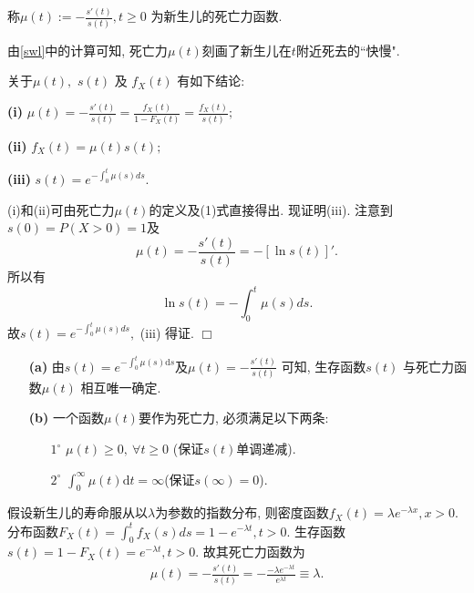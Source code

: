 \documentclass[a4paper,10pt]{ctexbook}
\def\qed{\hfill$\Box$\medskip}
\begin{document}
\begin{definition}
    称$\mu(t):=-\frac{s'(t)}{s(t)},t\ge 0$ 为新生儿的死亡力函数.
\end{definition}
由\eqref{swl}中的计算可知, 死亡力$\mu(t)$刻画了新生儿在$t$附近死去的``快慢".

\begin{proposition} 关于$\mu(t),$ $s(t)$ 及 $f_X(t)$ 有如下结论:

    {\rm\bf(i)} $\mu(t)=-\frac{s'(t)}{s(t)}=\frac{f_X(t)}{1-F_X(t)}=\frac{f_X(t)}{s(t)};$

    {\rm\bf(ii)} $f_X(t)=\mu(t)s(t);$

    {\rm\bf(iii)} $s(t)=e^{-\int_0^t\mu(s)ds}.$

\end{proposition}
\proof (i)和(ii)可由死亡力$\mu(t)$的定义及(1)式直接得出. 现证明(iii). 注意到$s(0)=P(X>0)=1$及
$$\mu(t)=-\frac{s'(t)}{s(t)}=-[\ln s(t)]'.$$ 所以有
$$\ln s(t)=-\int_0^t\mu(s)ds.$$ 故$s(t)=e^{-\int_0^t\mu(s)ds},$ (iii) 得证. \qed


\begin{remark}
    \begin{enumerate}
        \item[{\bf(a)}] 由$s(t) = e^{-\int_{0}^{t}\mu(s)\mathrm{d}s}$及$ \mu(t) = -\frac{s'(t)}{s(t)}$ 可知, 生存函数$s(t)$ 与死亡力函数$\mu(t)$ 相互唯一确定.
        \item[{\bf(b)}] 一个函数$\mu(t)$要作为死亡力, 必须满足以下两条:
            \begin{enumerate}
                \item[ $ 1^\circ$] $\mu(t) \geq 0, ~\forall t \geq 0$ (保证$s(t)$单调递减).
                \item[$2^\circ$] $\int_0^{\infty}\mu(t)\mathrm{d}t = \infty$(保证$s(\infty)=0$).
            \end{enumerate}
    \end{enumerate}

\end{remark}




\begin{example}
    假设新生儿的寿命服从以$\lambda$为参数的指数分布, 则密度函数$f_X(t)=\lambda e^{-\lambda x},x>0.$ 分布函数$F_X(t)=\int_0^t f_X(s)ds=1-e^{-\lambda t}, t>0.$ 生存函数$s(t)=1-F_X(t)=e^{-\lambda t},t>0.$  故其死亡力函数为
    \begin{align}\label{ep}
        \mu(t)=-\frac{s'(t)}{s(t)}=-\frac{-\lambda e^{-\lambda t}}{e^{\lambda t}}\equiv\lambda.
    \end{align}
\end{example}
\end{document}
